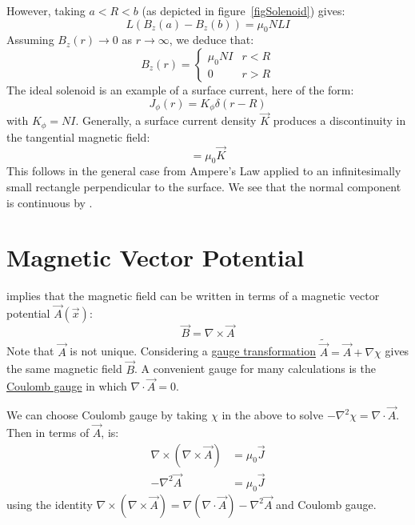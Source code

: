\documentclass[../Main.tex]{subfiles}
\begin{document}
However, taking $a < R < b$ (as depicted in figure~\ref{figSolenoid}) gives:
\begin{equation*}
    L(B_z(a) - B_z(b)) = \mu_0 N L I
\end{equation*}
Assuming $B_z(r) \to 0$ as $r \to \infty$, we deduce that:
\begin{equation*}
    B_z(r) =
    \begin{cases}
        \mu_0 N I & r < R \\
        0 & r > R
    \end{cases}
\end{equation*}
The ideal solenoid is an example of a surface current, here of the form:
\begin{equation*}
    J_\phi(r) = K_\phi\delta(r - R)
\end{equation*}
with $K_\phi = NI$. Generally, a surface current density $\vec{K}$ produces a discontinuity in the tangential magnetic field:
\begin{equation*}
    [\vec{n} \times \vec{B}] = \mu_0 \vec{K}
\end{equation*}
This follows in the general case from Ampere's Law applied to an infinitesimally small rectangle perpendicular to the surface. We see that the normal component is continuous by .
\section{Magnetic Vector Potential}
 implies that the magnetic field can be written in terms of a magnetic vector potential $\vec{A}(\vec{x})$:
\begin{equation*}
    \vec{B} = \nabla \times \vec{A}
\end{equation*}
Note that $\vec{A}$ is not unique. Considering a \underline{gauge transformation} $\tilde{\vec{A}} = \vec{A} + \nabla \chi$ gives the same magnetic field $\vec{B}$. A convenient gauge for many calculations is the \underline{Coulomb gauge} in which $\nabla \cdot \vec{A} = 0$.

We can choose Coulomb gauge by taking $\chi$ in the above to solve $-\nabla^2 \chi = \nabla \cdot \vec{A}$. Then in terms of $\vec{A}$,  is:
\begin{align}
    \nabla \times (\nabla \times \vec{A}) &= \mu_0 \vec{J} \nonumber \\
    -\nabla^2 \vec{A} &= \mu_0 \vec{J} \label{eqnMagnetPoisson}
\end{align}
using the identity $\nabla \times (\nabla \times \vec{A}) = \nabla(\nabla \cdot \vec{A}) - \nabla^2 \vec{A}$ and Coulomb gauge.
\end{document}
